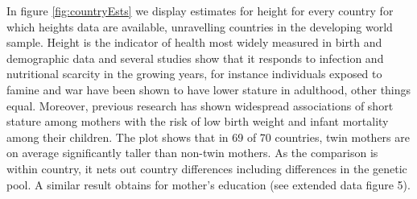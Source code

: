 \documentclass{nature}
\begin{document}
\begin{linenumbers}

In figure \ref{fig:countryEsts} we display estimates for height for every country for which heights data are available, unravelling countries in the developing world sample. Height is the indicator of health most widely measured in birth and demographic data and several studies show that it responds to infection and nutritional scarcity in the growing years, for instance individuals exposed to famine and war have been shown to have lower stature in adulthood, other things equal\cite{Silventoinen2003,Bozzolietal2009,Wangetal2010,Akreshetal2012}. Moreover, previous research has shown widespread associations of short stature among mothers with the risk of low birth weight and infant mortality among their children\cite{BhalotraRawlings2013}. The plot shows that in 69 of 70 countries, twin mothers are on average significantly taller than non-twin mothers. As the comparison is within country, it nets out country differences including differences in the genetic pool. A similar result obtains for mother's education\cite{Kenkel1991,CutlerLlerasMuney2010} (see extended data figure 5).


\end{linenumbers}
\end{document}
